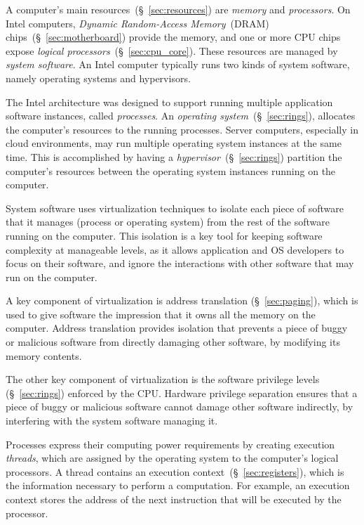 \label{sec:background_overview}

A computer's main resources~(\S~\ref{sec:resources}) are \textit{memory} and
\textit{processors}. On Intel computers, \textit{Dynamic Random-Access
Memory}~(DRAM) chips~(\S~\ref{sec:motherboard}) provide the memory, and one or
more CPU chips expose \textit{logical processors}~(\S~\ref{sec:cpu_core}).
These resources are managed by \textit{system software}. An Intel computer
typically runs two kinds of system software, namely operating systems and
hypervisors.

The Intel architecture was designed to support running multiple application
software instances, called \textit{processes}. An
\textit{operating system}~(\S~\ref{sec:rings}), allocates the computer's
resources to the running processes. Server computers, especially in cloud
environments, may run multiple operating system instances at the same time.
This is accomplished by having a \textit{hypervisor}~(\S~\ref{sec:rings})
partition the computer's resources between the operating system instances
running on the computer.

System software uses virtualization techniques to isolate each piece of
software that it manages (process or operating system) from the rest of the
software running on the computer. This isolation is a key tool for keeping
software complexity at manageable levels, as it allows application and OS
developers to focus on their software, and ignore the interactions with other
software that may run on the computer.

A key component of virtualization is address translation (\S~\ref{sec:paging}),
which is used to give software the impression that it owns all the memory on
the computer. Address translation provides isolation that prevents a piece of
buggy or malicious software from directly damaging other software, by modifying
its memory contents.

The other key component of virtualization is the software privilege levels
(\S~\ref{sec:rings}) enforced by the CPU. Hardware privilege separation ensures
that a piece of buggy or malicious software cannot damage other software
indirectly, by interfering with the system software managing it.

Processes express their computing power requirements by creating execution
\textit{threads}, which are assigned by the operating system to the computer's
logical processors. A thread contains an execution
context~(\S~\ref{sec:registers}), which is the information necessary to
perform a computation. For example, an execution context stores the address of
the next instruction that will be executed by the processor.

